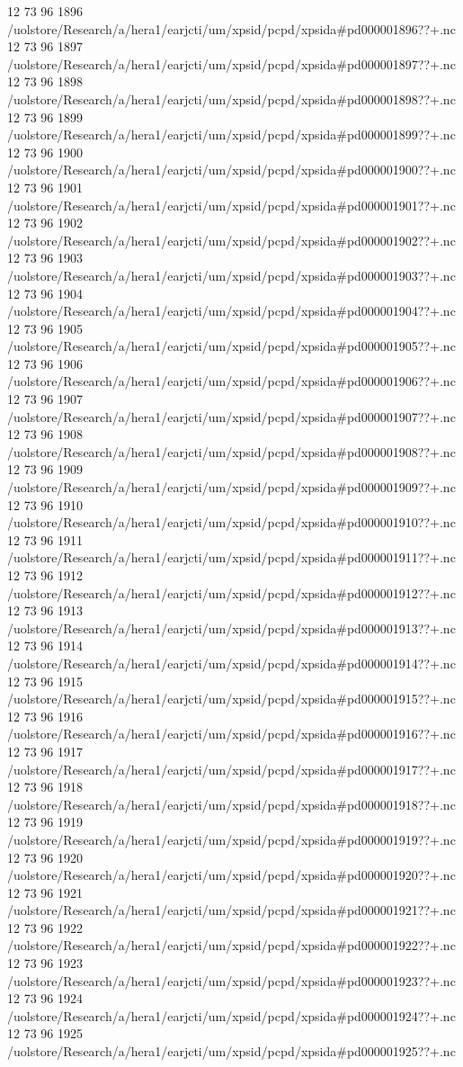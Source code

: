 12 73 96
1896
/uolstore/Research/a/hera1/earjcti/um/xpsid/pcpd/xpsida#pd000001896??+.nc
12 73 96
1897
/uolstore/Research/a/hera1/earjcti/um/xpsid/pcpd/xpsida#pd000001897??+.nc
12 73 96
1898
/uolstore/Research/a/hera1/earjcti/um/xpsid/pcpd/xpsida#pd000001898??+.nc
12 73 96
1899
/uolstore/Research/a/hera1/earjcti/um/xpsid/pcpd/xpsida#pd000001899??+.nc
12 73 96
1900
/uolstore/Research/a/hera1/earjcti/um/xpsid/pcpd/xpsida#pd000001900??+.nc
12 73 96
1901
/uolstore/Research/a/hera1/earjcti/um/xpsid/pcpd/xpsida#pd000001901??+.nc
12 73 96
1902
/uolstore/Research/a/hera1/earjcti/um/xpsid/pcpd/xpsida#pd000001902??+.nc
12 73 96
1903
/uolstore/Research/a/hera1/earjcti/um/xpsid/pcpd/xpsida#pd000001903??+.nc
12 73 96
1904
/uolstore/Research/a/hera1/earjcti/um/xpsid/pcpd/xpsida#pd000001904??+.nc
12 73 96
1905
/uolstore/Research/a/hera1/earjcti/um/xpsid/pcpd/xpsida#pd000001905??+.nc
12 73 96
1906
/uolstore/Research/a/hera1/earjcti/um/xpsid/pcpd/xpsida#pd000001906??+.nc
12 73 96
1907
/uolstore/Research/a/hera1/earjcti/um/xpsid/pcpd/xpsida#pd000001907??+.nc
12 73 96
1908
/uolstore/Research/a/hera1/earjcti/um/xpsid/pcpd/xpsida#pd000001908??+.nc
12 73 96
1909
/uolstore/Research/a/hera1/earjcti/um/xpsid/pcpd/xpsida#pd000001909??+.nc
12 73 96
1910
/uolstore/Research/a/hera1/earjcti/um/xpsid/pcpd/xpsida#pd000001910??+.nc
12 73 96
1911
/uolstore/Research/a/hera1/earjcti/um/xpsid/pcpd/xpsida#pd000001911??+.nc
12 73 96
1912
/uolstore/Research/a/hera1/earjcti/um/xpsid/pcpd/xpsida#pd000001912??+.nc
12 73 96
1913
/uolstore/Research/a/hera1/earjcti/um/xpsid/pcpd/xpsida#pd000001913??+.nc
12 73 96
1914
/uolstore/Research/a/hera1/earjcti/um/xpsid/pcpd/xpsida#pd000001914??+.nc
12 73 96
1915
/uolstore/Research/a/hera1/earjcti/um/xpsid/pcpd/xpsida#pd000001915??+.nc
12 73 96
1916
/uolstore/Research/a/hera1/earjcti/um/xpsid/pcpd/xpsida#pd000001916??+.nc
12 73 96
1917
/uolstore/Research/a/hera1/earjcti/um/xpsid/pcpd/xpsida#pd000001917??+.nc
12 73 96
1918
/uolstore/Research/a/hera1/earjcti/um/xpsid/pcpd/xpsida#pd000001918??+.nc
12 73 96
1919
/uolstore/Research/a/hera1/earjcti/um/xpsid/pcpd/xpsida#pd000001919??+.nc
12 73 96
1920
/uolstore/Research/a/hera1/earjcti/um/xpsid/pcpd/xpsida#pd000001920??+.nc
12 73 96
1921
/uolstore/Research/a/hera1/earjcti/um/xpsid/pcpd/xpsida#pd000001921??+.nc
12 73 96
1922
/uolstore/Research/a/hera1/earjcti/um/xpsid/pcpd/xpsida#pd000001922??+.nc
12 73 96
1923
/uolstore/Research/a/hera1/earjcti/um/xpsid/pcpd/xpsida#pd000001923??+.nc
12 73 96
1924
/uolstore/Research/a/hera1/earjcti/um/xpsid/pcpd/xpsida#pd000001924??+.nc
12 73 96
1925
/uolstore/Research/a/hera1/earjcti/um/xpsid/pcpd/xpsida#pd000001925??+.nc
